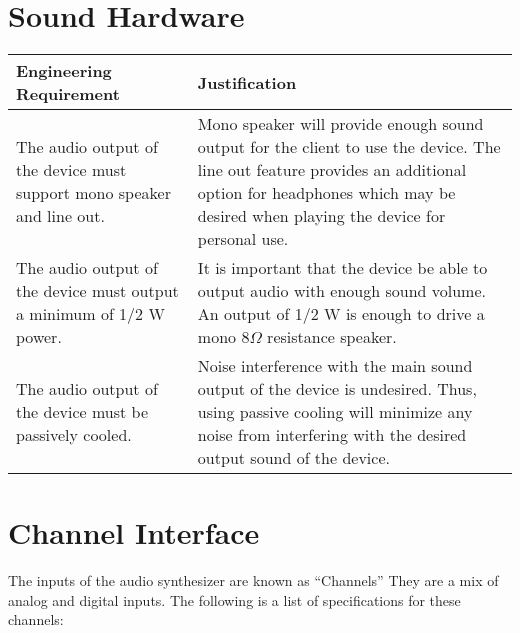 \documentclass{article}
\begin{document}
\section{Sound Hardware}

\begin{tabular}{|p{3in}|p{3in}|}
\hline
Engineering Requirement & Justification \\
\hline
The audio output of the device must support mono speaker and line out.&Mono speaker will provide enough sound output for the client to use the device.  The line out feature provides an additional option for headphones which may be desired when playing the device for personal use.\\
\hline
The audio output of the device must output a minimum of 1/2 W power.&It is important that the device be able to output audio with enough sound volume.  An output of 1/2 W is enough to drive a mono 8${\Omega}$ resistance speaker.\\
\hline
The audio output of the device must be passively cooled.&Noise interference with the main sound output of the device is undesired.  Thus, using passive cooling will minimize any noise from interfering with the desired output sound of the device.\\
\hline
\end{tabular}


\section{Channel Interface}

The inputs of the audio synthesizer are known as ``Channels'' They are
a mix of analog and digital inputs. The following is a list of
specifications for these channels:

\vspace {.3in}
\end{document}
